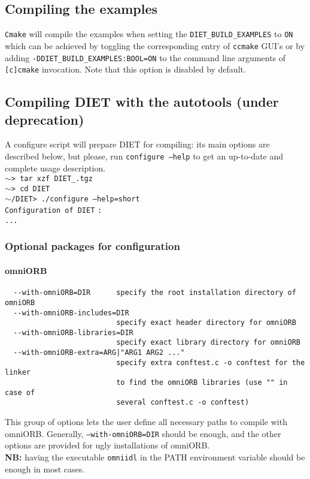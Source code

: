 \subsection{Compiling the examples}

\label{section:compiling-examples}
\verb+Cmake+ will compile the examples when setting the 
\verb+DIET_BUILD_EXAMPLES+ to \verb+ON+ which can be achieved by
toggling the corresponding entry of \verb+ccmake+ GUI's or by adding
\verb+-DDIET_BUILD_EXAMPLES:BOOL=ON+ to the command line
arguments of \verb+[c]cmake+ invocation.
Note that this option is disabled by default.

\subsection{Compiling DIET with the autotools (under deprecation)}
A configure script will prepare DIET for
compiling: its main options are described below, but please, run
\texttt{configure --help} to get an up-to-date and complete usage
description.\\

\noindent
{\footnotesize
\texttt{$\sim$> tar xzf DIET\_}\dietversion\texttt{.tgz} \\
\texttt{$\sim$> cd DIET} \\
\texttt{$\sim$/DIET> ./configure --help=short} \\
\texttt{Configuration of DIET} \dietversion \texttt{:} \\
\texttt{...}
}

\subsubsection{Optional packages for configuration}


\paragraph{omniORB}
{\footnotesize
\begin{verbatim}
  --with-omniORB=DIR      specify the root installation directory of omniORB
  --with-omniORB-includes=DIR
                          specify exact header directory for omniORB
  --with-omniORB-libraries=DIR
                          specify exact library directory for omniORB
  --with-omniORB-extra=ARG|"ARG1 ARG2 ..."
                          specify extra conftest.c -o conftest for the linker
                          to find the omniORB libraries (use "" in case of 
                          several conftest.c -o conftest)
\end{verbatim}
}
\noindent This group of options lets the user define all necessary
paths to compile with omniORB. Generally, \texttt{--with-omniORB=DIR}
should be enough, and the other options are provided for ugly
installations of omniORB.\\ \textbf{NB:} having the executable
\texttt{omniidl} in the PATH environment variable should be enough in
most cases.

